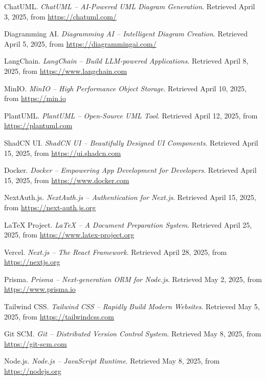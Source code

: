 \begin{thebibliography}{99}

    ChatUML. \textit{ChatUML – AI-Powered UML Diagram Generation}. Retrieved April 3, 2025, from \url{https://chatuml.com/}
    
    Diagramming AI. \textit{Diagramming AI – Intelligent Diagram Creation}. Retrieved April 5, 2025, from \url{https://diagrammingai.com/}
    
    LangChain. \textit{LangChain – Build LLM-powered Applications}. Retrieved April 8, 2025, from \url{https://www.langchain.com}

    MinIO. \textit{MinIO – High Performance Object Storage}. Retrieved April 10, 2025, from \url{https://min.io}

    PlantUML. \textit{PlantUML – Open-Source UML Tool}. Retrieved April 12, 2025, from \url{https://plantuml.com}

    ShadCN UI. \textit{ShadCN UI – Beautifully Designed UI Components}. Retrieved April 15, 2025, from \url{https://ui.shadcn.com}

    Docker. \textit{Docker – Empowering App Development for Developers}. Retrieved April 15, 2025, from \url{https://www.docker.com}

    NextAuth.js. \textit{NextAuth.js – Authentication for Next.js}. Retrieved April 15, 2025, from \url{https://next-auth.js.org}

    LaTeX Project. \textit{LaTeX – A Document Preparation System}. Retrieved April 25, 2025, from \url{https://www.latex-project.org}

    Vercel. \textit{Next.js – The React Framework}. Retrieved April 28, 2025, from \url{https://nextjs.org}

    Prisma. \textit{Prisma – Next-generation ORM for Node.js}. Retrieved May 2, 2025, from \url{https://www.prisma.io}

    Tailwind CSS. \textit{Tailwind CSS – Rapidly Build Modern Websites}. Retrieved May 5, 2025, from \url{https://tailwindcss.com}

    Git SCM. \textit{Git – Distributed Version Control System}. Retrieved May 8, 2025, from \url{https://git-scm.com}

    Node.js. \textit{Node.js – JavaScript Runtime}. Retrieved May 8, 2025, from \url{https://nodejs.org}


\end{thebibliography}
